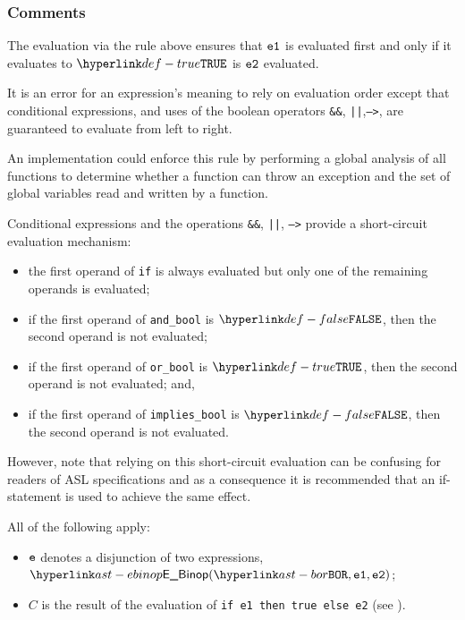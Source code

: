 \subsubsection{Comments}
The evaluation via the rule above ensures that $\texttt{e1}$ is evaluated first and
only if it evaluates to $\True$ is $\texttt{e2}$ evaluated.



It is an error for an expression’s meaning to rely on evaluation order except
that conditional expressions, and uses of the boolean operators \texttt{\&\&},
\texttt{||},\texttt{-->}, are guaranteed to evaluate from left to right.


An implementation could enforce this rule by performing a global analysis of
all functions to determine whether a function can throw an exception and the
set of global variables read and written by a function.

Conditional expressions and the operations \texttt{\&\&}, \texttt{||},
\texttt{-->} provide a short-circuit evaluation mechanism:

\begin{itemize}
\item the first operand of \texttt{if} is always evaluated but only one of the
remaining operands is evaluated;
\item if the first operand of \texttt{and\_bool} is $\False$, then the second operand is not evaluated;
\item if the first operand of \texttt{or\_bool} is $\True$, then the second operand is not evaluated; and,
\item if the first operand of \texttt{implies\_bool} is $\False$, then the
second operand is not evaluated.
\end{itemize}

However, note that relying on this short-circuit evaluation can be confusing
for readers of ASL specifications and as a consequence it is recommended that
an if-statement is used to achieve the same effect.

\ProseParagraph
All of the following apply:
\begin{itemize}
\item $\texttt{e}$ denotes a disjunction of two expressions, $\EBinop(\BOR, \veone, \vetwo)$;
\item $C$ is the result of the evaluation of
      \texttt{if e1 then true else e2} (see ).
\end{itemize}

